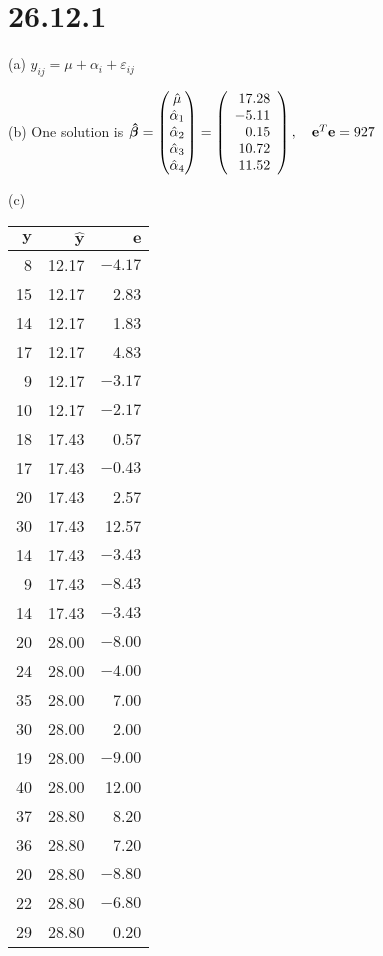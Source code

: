 \section*{26.12.1}
(a) $y_{ij}=\mu+\alpha_i+\varepsilon_{ij}$

\noindent
(b) One solution is
$\bm{\hat\beta}=
\begin{pmatrix}
\hat\mu\cr
\hat\alpha_1\cr
\hat\alpha_2\cr
\hat\alpha_3\cr
\hat\alpha_4
\end{pmatrix}=
\left(
\begin{array}{r}
17.28\\
-5.11\\
0.15\\
10.72\\
11.52
\end{array}
\right),\quad
\mathbf e^T\mathbf e=927
$

\noindent
(c)
\begin{center}
\begin{tabular}{|r|r|r|}
\hline
$\mathbf y$ & $\mathbf{\hat y}$ & $\mathbf e$\\
\hline
  8 & 12.17 & $-4.17$\\
  15 &12.17 & 2.83\\
  14 &12.17 & 1.83\\
  17 &12.17 & 4.83\\
   9 &12.17 & $-3.17$\\
  10 &12.17 & $-2.17$\\
  18 &17.43 & 0.57\\
  17 &17.43 & $-0.43$\\
  20 &17.43 & 2.57\\
 30 &17.43 & 12.57\\
 14 &17.43 & $-3.43$\\
  9 &17.43 & $-8.43$\\
 14 &17.43 & $-3.43$\\
 20 &28.00 & $-8.00$\\
 24 &28.00 & $-4.00$\\
 35 &28.00 &  7.00\\
 30 &28.00 & 2.00\\
 19 &28.00 & $-9.00$\\
 40 &28.00 & 12.00\\
 37 &28.80 & 8.20\\
 36 &28.80 & 7.20\\
 20 &28.80 & $-8.80$\\
 22 &28.80 & $-6.80$\\
 29 &28.80 & 0.20\\
 \hline
\end{tabular}
\end{center}

